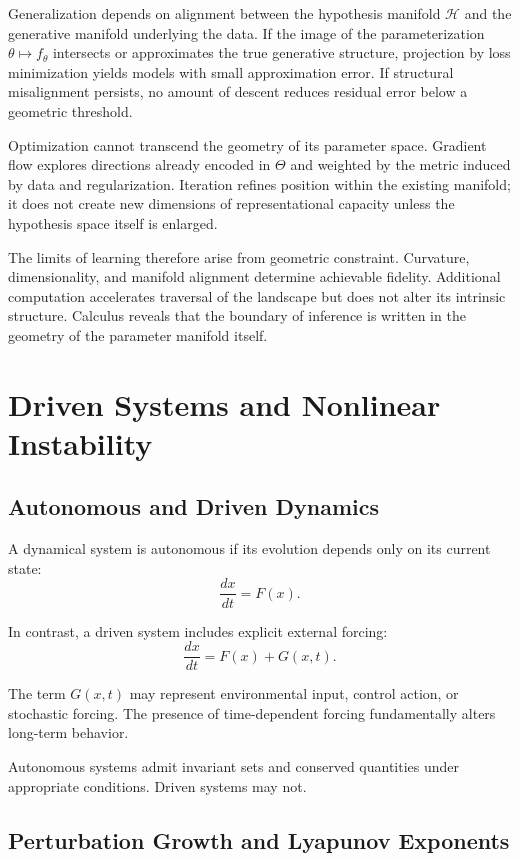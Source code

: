 \documentclass[12pt]{book}
\begin{document}
Generalization depends on alignment between the hypothesis manifold $\mathcal{H}$ and the generative manifold underlying the data. If the image of the parameterization $\theta \mapsto f_\theta$ intersects or approximates the true generative structure, projection by loss minimization yields models with small approximation error. If structural misalignment persists, no amount of descent reduces residual error below a geometric threshold.

Optimization cannot transcend the geometry of its parameter space. Gradient flow explores directions already encoded in $\Theta$ and weighted by the metric induced by data and regularization. Iteration refines position within the existing manifold; it does not create new dimensions of representational capacity unless the hypothesis space itself is enlarged.

The limits of learning therefore arise from geometric constraint. Curvature, dimensionality, and manifold alignment determine achievable fidelity. Additional computation accelerates traversal of the landscape but does not alter its intrinsic structure. Calculus reveals that the boundary of inference is written in the geometry of the parameter manifold itself.

\chapter{Driven Systems and Nonlinear Instability}

\section{Autonomous and Driven Dynamics}

A dynamical system is autonomous if its evolution depends only on its current state:
\[
\frac{dx}{dt} = F(x).
\]

In contrast, a driven system includes explicit external forcing:
\[
\frac{dx}{dt} = F(x) + G(x,t).
\]

The term $G(x,t)$ may represent environmental input, control action, or stochastic forcing. The presence of time-dependent forcing fundamentally alters long-term behavior.

Autonomous systems admit invariant sets and conserved quantities under appropriate conditions. Driven systems may not.

\section{Perturbation Growth and Lyapunov Exponents}
\end{document}
